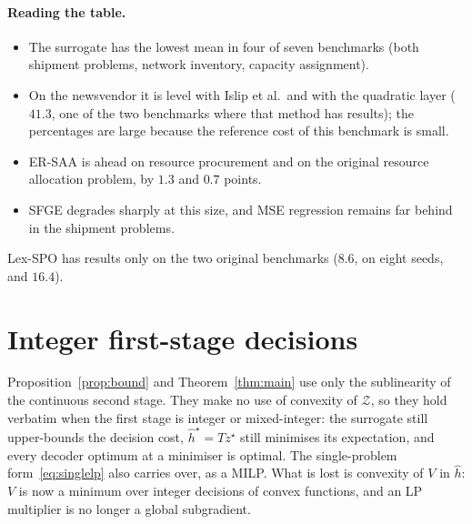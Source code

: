 \documentclass[11pt,a4paper]{article}
\theoremstyle{remark}
\newcommand{\Z}{\mathcal Z}
\newcommand{\hh}{\hat h}
\begin{document}
\paragraph{Reading the table.}
\begin{itemize}
\item The surrogate has the lowest mean in four of seven benchmarks (both
      shipment problems, network inventory, capacity assignment).
\item On the newsvendor it is level with Islip et al.\ and with the quadratic
      layer ($41.3$, one of the two benchmarks where that method has
      results); the percentages are large because the reference cost of this
      benchmark is small.
\item ER-SAA is ahead on resource procurement and on the original resource
      allocation problem, by $1.3$ and $0.7$ points.
\item SFGE degrades sharply at this size, and MSE regression remains far
      behind in the shipment problems.
\end{itemize}
Lex-SPO has results only on the two original benchmarks ($8.6$, on eight
seeds, and $16.4$).

\section{Integer first-stage decisions}\label{sec:integer}

Proposition~\ref{prop:bound} and Theorem~\ref{thm:main} use only the
sublinearity of the continuous second stage. They make no use of convexity of
$\Z$, so they hold verbatim when the first stage is integer or mixed-integer:
the surrogate still upper-bounds the decision cost, $\hh^\star=Tz^\star$ still
minimises its expectation, and every decoder optimum at a minimiser is
optimal. The single-problem form~\eqref{eq:singlelp} also carries over, as a MILP. What
is lost is convexity of $V$ in $\hh$: $V$ is now a minimum over integer
decisions of convex functions, and an LP multiplier is no longer a global
subgradient.
\end{document}
